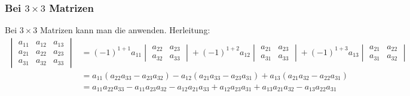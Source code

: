 \subsubsection*{\textbf{Bei $3 \times 3$ Matrizen}}
Bei $3 \times 3$ Matrizen kann man die  anwenden. Herleitung:
\begin{align*}
    \begin{vmatrix}
        a_{11} & a_{12} & a_{13} \\
        a_{21} & a_{22} & a_{23} \\
        a_{31} & a_{32} & a_{33}
    \end{vmatrix} &= (-1)^{1+1} a_{11} \begin{vmatrix}
        a_{22} & a_{23} \\
        a_{32} & a_{33}
    \end{vmatrix} + (-1)^{1+2} a_{12} \begin{vmatrix}
        a_{21} & a_{23} \\
        a_{31} & a_{33}
    \end{vmatrix} + (-1)^{1+3} a_{13} \begin{vmatrix}
        a_{21} & a_{22} \\
        a_{31} & a_{32}
    \end{vmatrix} \\
    &= a_{11}(a_{22}a_{33} - a_{23}a_{32}) - a_{12}(a_{21}a_{33} - a_{23}a_{31}) + a_{13}(a_{21}a_{32} - a_{22}a_{31}) \\
    &= a_{11}a_{22}a_{33} - a_{11}a_{23}a_{32} - a_{12}a_{21}a_{33} + a_{12}a_{23}a_{31} + a_{13}a_{21}a_{32} - a_{13}a_{22}a_{31}
\end{align*}\pagebreak

